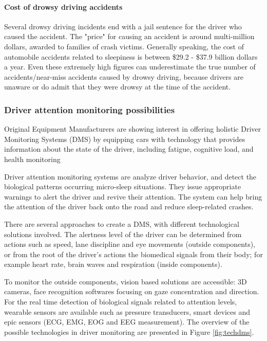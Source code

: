 \documentclass[letterpaper,10pt]{article}
\begin{document}
\paragraph{Cost of drowsy driving accidents}

Several drowsy driving incidents end with a jail sentence for the driver who caused the accident. The "price" for causing an accident is around multi-million dollars, awarded to families of crash victims. \cite{drowsy}
Generally speaking, the cost of automobile accidents related to sleepiness is between \$29.2 - \$37.9 billion dollars a year. Even these extremely high figures can underestimate the true number of accidents/near-miss accidents caused by drowsy driving, because  drivers are unaware or do admit that they were drowsy at the time of the accident. \cite{drowsy_sleepfoundation}

\subsubsection{Driver attention monitoring possibilities}

Original Equipment Manufacturers are showing interest in offering holistic Driver Monitoring Systems (DMS) by equipping cars with technology that provides information about the state of the driver, including fatigue, cognitive load,  and health monitoring \cite{f&s_car}

Driver attention monitoring systems are analyze driver behavior, and detect the biological patterns occurring micro-sleep situations. They issue appropriate warnings to alert the driver and revive their attention. The system can help bring the attention of the driver back onto the road and reduce sleep-related crashes.  \cite{f&s_car}

There are several approaches to create a DMS, with different technological solutions involved. The alertness level of the driver can be determined from actions such as speed, lane discipline and eye movements (outside components), or from the root of the driver's actions the biomedical signals from their body; for example heart rate, brain waves and respiration (inside components).

To monitor the outside components, vision based solutions are accessible: 3D cameras, face recognition softwares focusing on gaze concentration and direction. For the real time detection of biological signals related to attention levels, wearable sensors are available such as pressure transducers, smart devices and epic sensors (ECG, EMG, EOG and EEG measurement). The overview of the possible technologies in driver monitoring are presented in Figure \ref{fig:techdms}. %
\end{document}

